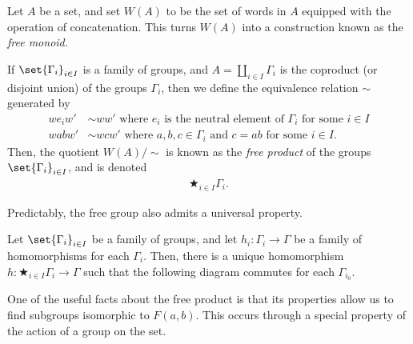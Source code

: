 \documentclass[10pt]{mypackage2}
\begin{document}
\begin{definition}\label{def:free_product}
  Let $A$ be a set, and set $W(A)$ to be the set of words in $A$ equipped with the operation of concatenation. This turns $W(A)$ into a construction known as the \textit{free monoid.}\newline

  If $\set{\Gamma_i}_{i\in I}$ is a family of groups, and $A = \coprod_{i\in I}\Gamma_i$ is the coproduct (or disjoint union) of the groups $\Gamma_i$, then we define the equivalence relation $\sim$ generated by
  \begin{align*}
    we_iw' &\sim ww'\text{ where $e_i$ is the neutral element of $\Gamma_i$ for some $i\in I$}\\
    wabw' &\sim wcw'\text{ where $a,b,c\in \Gamma_i$ and $c=ab$ for some $i\in I$}.
  \end{align*}
  Then, the quotient $W(A)/\sim$ is known as the \textit{free product} of the groups $\set{\Gamma_i}_{i\in I}$, and is denoted
  \begin{align*}
    \bigstar_{i\in I}\Gamma_i.
  \end{align*}
\end{definition}
Predictably, the free group also admits a universal property.
\begin{theorem}\label{thm:universal_property}
  Let $\set{\Gamma_i}_{i\in I}$ be a family of groups, and let $h_i\colon \Gamma_i\rightarrow \Gamma$ be a family of homomorphisms for each $\Gamma_i$. Then, there is a unique homomorphism $h\colon \bigstar_{i\in I}\Gamma_i\rightarrow \Gamma$ such that the following diagram commutes for each $\Gamma_{i_0}$.
  \begin{center}
  \end{center}
\end{theorem}
One of the useful facts about the free product is that its properties allow us to find subgroups isomorphic to $F(a,b)$. This occurs through a special property of the action of a group on the set.
\end{document}
